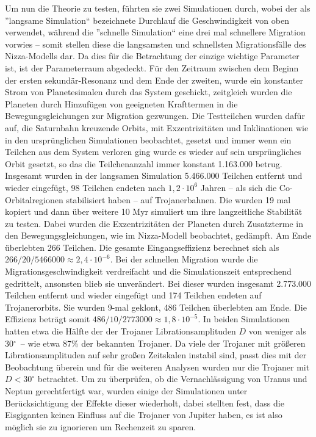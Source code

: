 \documentclass[12pt,a4paper,twoside,open=right,bibliography=totoc]{scrbook}
\renewcommand{\cite}{ \citep}
\newcommand{\degree}{$^\circ$}
\begin{document}
Um nun die Theorie zu testen, führten sie zwei Simulationen durch,
wobei der als ''langsame Simulation`` bezeichnete Durchlauf die Geschwindigkeit von oben verwendet, während die ''schnelle Simulation`` eine drei mal schnellere Migration vorwies – somit stellen diese die langsamsten und schnellsten Migrationsfälle des Nizza-Modells dar. Da dies für die Betrachtung der einzige wichtige Parameter ist, ist der Parameterraum abgedeckt.
Für den Zeitraum zwischen dem Beginn der ersten sekundär-Resonanz und dem Ende der zweiten, wurde ein konstanter Strom von Planetesimalen durch das System geschickt,
zeitgleich wurden die Planeten durch Hinzufügen von geeigneten Krafttermen in die Bewegungsgleichungen zur Migration gezwungen.
Die Testteilchen wurden dafür auf, die Saturnbahn kreuzende Orbits, mit Exzentrizitäten und Inklinationen wie in den ursprünglichen Simulationen beobachtet, gesetzt und immer wenn ein Teilchen aus dem System verloren ging wurde es wieder auf sein ursprüngliches Orbit gesetzt, so das die Teilchenanzahl immer konstant 1.163.000 betrug.
Insgesamt wurden in der langsamen Simulation 5.466.000 Teilchen entfernt und wieder eingefügt, 98 Teilchen endeten nach $1,2 \cdot 10^6$ Jahren – als sich die Co-Orbitalregionen stabilisiert haben – auf Trojanerbahnen.
Die wurden 19 mal kopiert %
 und dann über weitere 10 Myr simuliert um ihre langzeitliche Stabilität zu testen.
Dabei wurden die Exzentrizitäten der Planeten durch Zusatzterme in den Bewegungsgleichungen, wie im Nizza-Modell beobachtet, gedämpft. Am Ende überlebten 266 Teilchen. Die gesamte Eingangseffizienz berechnet sich als $266/20/5466000 \approx 2,4 \cdot 10^{-6}$.
Bei der schnellen Migration wurde die Migrationsgeschwindigkeit verdreifacht und die Simulationszeit entsprechend gedrittelt, ansonsten blieb sie unverändert.
Bei dieser wurden insgesamt 2.773.000 Teilchen entfernt und wieder eingefügt und 174 Teilchen endeten auf Trojanerorbits. Sie wurden 9-mal geklont, 486 Teilchen überlebten am Ende.
Die Effizienz beträgt somit $486/10/2773000 \approx 1,8 \cdot 10^{-5}$.
In beiden Simulationen hatten etwa die Hälfte der der Trojaner Librationsamplituden $D$ von weniger als 30\degree\ – wie etwa 87\% der bekannten Trojaner.
Da viele der Trojaner mit größeren Librationsamplituden auf sehr großen Zeitskalen instabil sind, passt dies mit der Beobachtung überein und für die weiteren Analysen wurden nur die Trojaner mit $D<30^\circ$ betrachtet. %
Um zu überprüfen, ob die Vernachlässigung von Uranus und Neptun gerechtfertigt war,
wurden einige der Simulationen unter Berücksichtigung der Effekte dieser wiederholt, dabei stellten
\cite{Morbidelli2005} fest, dass die Eisgiganten keinen Einfluss auf die Trojaner von Jupiter haben, es ist also möglich sie zu ignorieren um Rechenzeit zu sparen.
\end{document}
